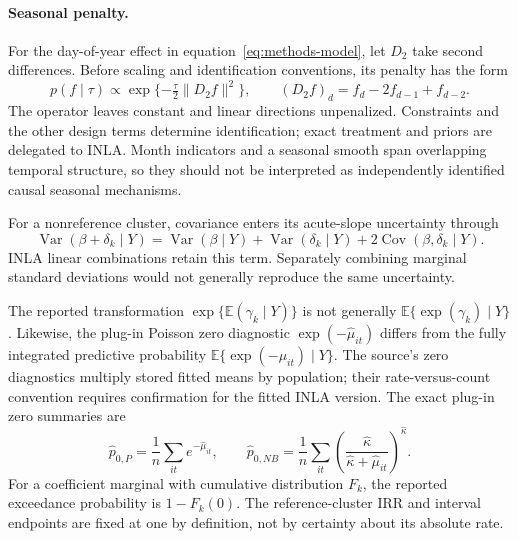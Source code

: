 \documentclass[11pt,letterpaper]{article}
\newcommand{\E}{\mathbb{E}}
\newcommand{\Var}{\operatorname{Var}}
\begin{document}
\paragraph{Seasonal penalty.}
For the day-of-year effect in equation~\eqref{eq:methods-model}, let \(D_2\) take second differences. Before scaling and identification conventions, its penalty has the form
\begin{equation}
 p(f\mid\tau)\propto\exp\{-\tfrac{\tau}{2}\|D_2f\|^2\},
 \qquad (D_2f)_d=f_d-2f_{d-1}+f_{d-2}.
\end{equation}
The operator leaves constant and linear directions unpenalized. Constraints and the other design terms determine identification; exact treatment and priors are delegated to INLA. Month indicators and a seasonal smooth span overlapping temporal structure, so they should not be interpreted as independently identified causal seasonal mechanisms.

For a nonreference cluster, covariance enters its acute-slope uncertainty through
\begin{equation}
 \Var(\beta+\delta_k\mid Y)=\Var(\beta\mid Y)+\Var(\delta_k\mid Y)
 +2\operatorname{Cov}(\beta,\delta_k\mid Y).
\end{equation}
INLA linear combinations retain this term. Separately combining marginal standard deviations would not generally reproduce the same uncertainty.

The reported transformation \(\exp\{\E(\gamma_k\mid Y)\}\) is not generally \(\E\{\exp(\gamma_k)\mid Y\}\). Likewise, the plug-in Poisson zero diagnostic \(\exp(-\widehat\mu_{it})\) differs from the fully integrated predictive probability \(\E\{\exp(-\mu_{it})\mid Y\}\). The source's zero diagnostics multiply stored fitted means by population; their rate-versus-count convention requires confirmation for the fitted INLA version.
The exact plug-in zero summaries are
\begin{equation}
 \widehat p_{0,P}=\frac1n\sum_{it}e^{-\widehat\mu_{it}},\qquad
 \widehat p_{0,NB}=\frac1n\sum_{it}
 \left(\frac{\widehat\kappa}{\widehat\kappa+\widehat\mu_{it}}\right)^{\widehat\kappa}.
\end{equation}
For a coefficient marginal with cumulative distribution \(F_k\), the reported exceedance probability is \(1-F_k(0)\). The reference-cluster IRR and interval endpoints are fixed at one by definition, not by certainty about its absolute rate.
\end{document}
